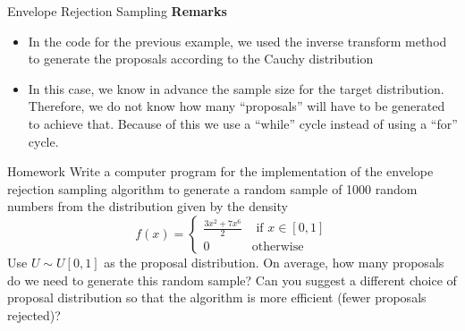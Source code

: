 \documentclass[8pt]{beamer}
\begin{document}
\begin{frame}{Envelope Rejection Sampling}
\textbf{Remarks} 
\begin{itemize}
	\item In the code for the previous example, we used the inverse transform method to generate the proposals according to the Cauchy distribution
	\item In this case, we know in advance the sample size for the target distribution. Therefore, we do not know how many ``proposals'' will have to be generated to achieve that. Because of this we use a ``while'' cycle instead of using a ``for'' cycle.
\end{itemize}
\end{frame}

\begin{frame}{Homework}
Write a computer program for the implementation of the envelope rejection sampling algorithm to generate a random sample of 1000 random numbers from the distribution given by the density 
\begin{equation*}
f(x)=\left\{ \begin{array}{ll}
\displaystyle{\frac{3x^2+7x^6}{2}} & \text { if } x\in [0,1]\\
0 & \text{otherwise}
\end{array}
\right.
\end{equation*}
Use $U \sim U[0,1]$ as the proposal distribution. On average, how many proposals do we need to generate this random sample? Can you suggest a different choice of proposal distribution so that the algorithm is more efficient (fewer proposals rejected)?
\end{frame}
\end{document}
